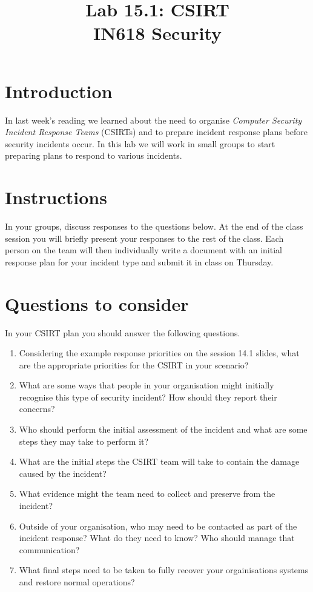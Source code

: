 \documentclass{article}
\begin{document}
\title{ Lab 15.1: CSIRT \\ IN618 Security}
\maketitle

\section*{Introduction}
In last week's reading we learned about the need to organise \emph{Computer Security Incident Response Teams} (CSIRTs) and to prepare incident response plans before security incidents occur.  In this lab we will work in small groups to start preparing plans to respond to various incidents. 

\section{Instructions}
In your groups, discuss responses to the questions below. At the end of the class session you will briefly present your responses to the rest of the class. Each person on the team will then individually write a document with an initial response plan for your incident type and submit it in class on Thursday.

\section{Questions to consider}
In your CSIRT plan you should answer the following questions.

\begin{enumerate}
	\item Considering the example response priorities on the session 14.1 slides, what are the appropriate priorities for the CSIRT in your scenario?
	
	\item What are some ways that people in your organisation might initially recognise this type of security incident?  How should they report their concerns?
	
	\item Who should perform the initial assessment of the incident and what are some steps they may take to perform it?
	
	\item What are the initial steps the CSIRT team will take to contain the damage caused by the incident?
	
	\item What evidence might the team need to collect and preserve from the incident?
	
	\item Outside of your organisation, who may need to be contacted as part of the incident response?  What do they need to know?  Who should manage that communication?
	
	\item What final steps need to be taken to fully recover your orgainisations systems and restore normal operations?
	
	   
\end{enumerate}
\end{document}
